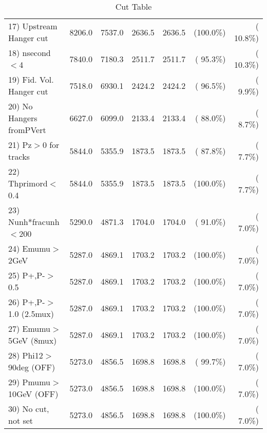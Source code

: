 \begin{table}[h!]
\begin{tabular}{||l||r|r|r|r|r|r||}
 17) Upstream Hanger cut  &       8206.0 &       7537.0 &       2636.5 &       2636.5 & (100.0\%) & ( 10.8\%) \\
 18) nsecond$<$4          &       7840.0 &       7180.3 &       2511.7 &       2511.7 & ( 95.3\%) & ( 10.3\%) \\
 19) Fid. Vol. Hanger cut &       7518.0 &       6930.1 &       2424.2 &       2424.2 & ( 96.5\%) & (  9.9\%) \\
 20) No Hangers fromPVert &       6627.0 &       6099.0 &       2133.4 &       2133.4 & ( 88.0\%) & (  8.7\%) \\
 21) Pz$>$0 for tracks    &       5844.0 &       5355.9 &       1873.5 &       1873.5 & ( 87.8\%) & (  7.7\%) \\
 22) Thprimord$<$0.4      &       5844.0 &       5355.9 &       1873.5 &       1873.5 & (100.0\%) & (  7.7\%) \\
 23) Nunh*fracunh$<$200   &       5290.0 &       4871.3 &       1704.0 &       1704.0 & ( 91.0\%) & (  7.0\%) \\
 24) Emumu$>$2GeV         &       5287.0 &       4869.1 &       1703.2 &       1703.2 & (100.0\%) & (  7.0\%) \\
 25) P+,P-$>$0.5          &       5287.0 &       4869.1 &       1703.2 &       1703.2 & (100.0\%) & (  7.0\%) \\
 26) P+,P-$>$1.0 (2.5mux) &       5287.0 &       4869.1 &       1703.2 &       1703.2 & (100.0\%) & (  7.0\%) \\
 27) Emumu$>$5GeV  (8mux) &       5287.0 &       4869.1 &       1703.2 &       1703.2 & (100.0\%) & (  7.0\%) \\
 28) Phi12$>$90deg  (OFF) &       5273.0 &       4856.5 &       1698.8 &       1698.8 & ( 99.7\%) & (  7.0\%) \\
 29) Pmumu$>$10GeV  (OFF) &       5273.0 &       4856.5 &       1698.8 &       1698.8 & (100.0\%) & (  7.0\%) \\
 30) No cut, not set      &       5273.0 &       4856.5 &       1698.8 &       1698.8 & (100.0\%) & (  7.0\%) \\
 \hline
 \hline
 \end{tabular}
 \caption{Cut Table           }
 \label{tab-cutcohjpsi-mumu_ccdis}
 \end{table}
